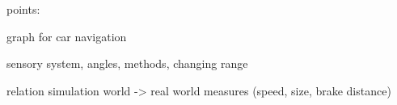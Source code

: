 points:

graph for car navigation

sensory system, angles, methods, changing range

relation simulation world -> real world measures (speed, size, brake distance)



